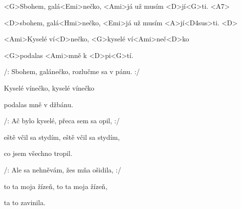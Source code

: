 

\zs
<G>Sbohem, galá<Emi>nečko,
<Ami>já už musím <D>jí<G>ti. <A7> 

<D>sbohem, galá<Hmi>nečko,
<Emi>já už musím <A>jí<D4sus>ti. <D> 

<Ami>Kyselé ví<D>nečko, <G>kyselé ví<Ami>neč<D>ko 

<G>podalas <Ami>mně k <D>pi<G>tí.
\ks

\zs
/: Sbohem, galánečko, rozlučme sa v pánu. :/

Kyselé vínečko, kyselé vínečko

podalas mně v džbánu.
\ks

\zs
/: Ač bylo kyselé, přeca sem sa opil, :/

eště včil sa stydím, eště včil sa stydím,

co jsem všechno tropil.
\ks

\zs
/: Ale sa nehněvám, žes mňa ošidila, :/

to ta moja žízeň, to ta moja žízeň,

ta to zavinila.
\ks
\kp

